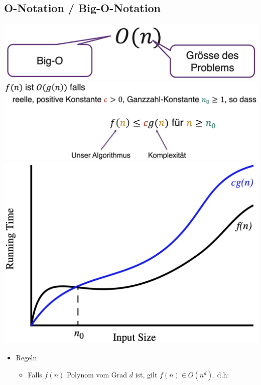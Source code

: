 \documentclass[a4paper, landscape, 8pt]{scrartcl}
\begin{document}
\begin{multicols*}{4}
            \subsection{O-Notation / Big-O-Notation}
                \includegraphics[scale=0.15]{graphic/15_big_o_notation_erklaerung}
                \newline
                \includegraphics[scale=0.15]{graphic/14_big_o_notation_herleitung}
                \newline
                \includegraphics[scale=0.15]{graphic/03_big_o_notation}
                \begin{itemize}
                    \item Regeln
                    \begin{itemize}
                        \item Falls $f(n)$ Polynom vom Grad $d$ ist, gilt $f(n) \in O(n^d)$, d.h:
                        \begin{itemize}

\end{itemize}
\end{itemize}
\end{itemize}
\end{multicols*}
\end{document}
